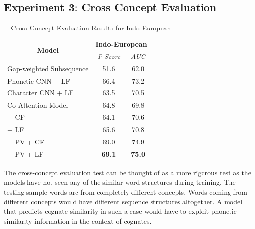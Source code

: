 \documentclass[11pt,letterpaper]{article}
\begin{document}

\subsection{Experiment 3: Cross Concept Evaluation}

\begin{table}[htpb]
\centering
\begin{tabular}{lcccccc}
\multicolumn{1}{c}{\multirow{2}{*}{\textbf{Model}}} & \multicolumn{2}{c}{\textbf{Indo-European}} \\ \cline{2-3} 
\multicolumn{1}{c}{}                                & \textit{F-Score}      & \textit{AUC}    \\ \hline
Gap-weighted Subsequence              & 51.6                  & 62.0            \\
Phonetic CNN + LF                     & 66.4                  & 73.2            \\
Character CNN + LF                    & 63.5                  & 70.5            \\ \hline
Co-Attention Model                    & 64.8                  & 69.8            \\
\quad + CF                            & 64.1                  & 70.6            \\
\quad + LF                            & 65.6                  & 70.8            \\
\quad + PV + CF                       & 69.0                  & 74.9            \\
\quad + PV + LF                       & \textbf{69.1}                  & \textbf{75.0}
\end{tabular}
\label{CC_res}
\caption{Cross Concept Evaluation Results for Indo-European }
\end{table}

The cross-concept evaluation test can be thought of as a more rigorous test as the models have not seen any of the similar word structures during training. The testing sample words are from completely different concepts. Words coming from different concepts would have different sequence structures altogether. A model that predicts cognate similarity in such a case would have to exploit phonetic similarity information in the context of cognates. 
\end{document}
